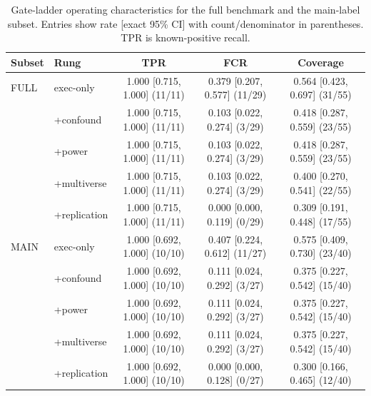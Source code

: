 \begin{table}[t]
\centering
\caption{Gate-ladder operating characteristics for the full benchmark and the main-label subset. Entries show rate [exact 95\% CI] with count/denominator in parentheses. TPR is known-positive recall.}
\label{tab:gate_ladder}
\scriptsize
\setlength{\tabcolsep}{4pt}
\begin{tabular}{@{}llccc@{}}
\toprule
Subset & Rung & TPR & FCR & Coverage \\
\midrule
FULL & exec-only & 1.000 [0.715, 1.000] (11/11) & 0.379 [0.207, 0.577] (11/29) & 0.564 [0.423, 0.697] (31/55) \\
 & +confound & 1.000 [0.715, 1.000] (11/11) & 0.103 [0.022, 0.274] (3/29) & 0.418 [0.287, 0.559] (23/55) \\
 & +power & 1.000 [0.715, 1.000] (11/11) & 0.103 [0.022, 0.274] (3/29) & 0.418 [0.287, 0.559] (23/55) \\
 & +multiverse & 1.000 [0.715, 1.000] (11/11) & 0.103 [0.022, 0.274] (3/29) & 0.400 [0.270, 0.541] (22/55) \\
 & +replication & 1.000 [0.715, 1.000] (11/11) & 0.000 [0.000, 0.119] (0/29) & 0.309 [0.191, 0.448] (17/55) \\
\midrule
MAIN & exec-only & 1.000 [0.692, 1.000] (10/10) & 0.407 [0.224, 0.612] (11/27) & 0.575 [0.409, 0.730] (23/40) \\
 & +confound & 1.000 [0.692, 1.000] (10/10) & 0.111 [0.024, 0.292] (3/27) & 0.375 [0.227, 0.542] (15/40) \\
 & +power & 1.000 [0.692, 1.000] (10/10) & 0.111 [0.024, 0.292] (3/27) & 0.375 [0.227, 0.542] (15/40) \\
 & +multiverse & 1.000 [0.692, 1.000] (10/10) & 0.111 [0.024, 0.292] (3/27) & 0.375 [0.227, 0.542] (15/40) \\
 & +replication & 1.000 [0.692, 1.000] (10/10) & 0.000 [0.000, 0.128] (0/27) & 0.300 [0.166, 0.465] (12/40) \\
\bottomrule
\end{tabular}
\end{table}
